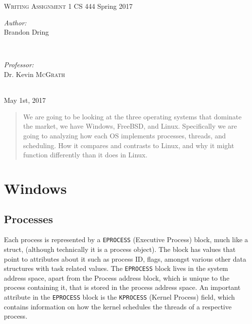 \documentclass[10pt,conference,draftclsnofoot,onecolumn]{IEEEtran}
\begin{document}
\begin{titlepage}

\center 
 
\textsc{\LARGE Writing Assignment 1} \newline \newline
{\large CS 444 Spring 2017}



\begin{minipage}{0.4\textwidth}
   \begin{flushleft} \large
      \emph{Author:}\\
      Brandon Dring
   \end{flushleft}
\end{minipage}
~
\begin{minipage}{0.4\textwidth}
   \begin{flushright} \large
      \emph{Professor:} \\
      Dr. Kevin \textsc{McGrath} %
   \end{flushright}
\end{minipage} \\ [4cm]

{\large May 1st, 2017} 
\vfill %

\begin{abstract}
    We are going to be looking at the three operating systems that dominate the market, we have Windows, FreeBSD, and Linux. Specifically we are going to analyzing how each OS implements processes, threads, and scheduling. How it compares and contrasts to Linux, and why it might function differently than it does in Linux. 
\end{abstract}


\pagebreak

\end{titlepage}
\newpage

\section{Windows}


\subsection{Processes} 
    Each process is represented by a \texttt{EPROCESS}
    (Executive Process) block, much like a struct, (although technically it is a process object)\cite{1}. The block has values that point to attributes about it such as process ID, flags, amongst various other data structures with task related values. The \texttt{EPROCESS} block lives in the system address space, apart from the Process address block, which is unique to the process containing it, that is stored in the process address space.  An important attribute in the \texttt{EPROCESS} block is the \texttt{KPROCESS} (Kernel Process) field, which contains information on how the kernel schedules the threads of a respective process. 
\end{document}
